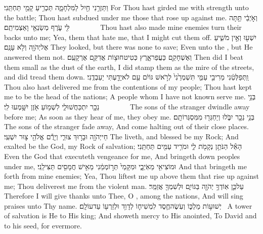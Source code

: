 {וַתַּזְרֵ֥נִי חַ֖יִל לַמִּלְחָמָ֑ה תַּכְרִ֥יעַ קָמַ֖י תַּחְתֵּֽנִי׃}
{For Thou hast girded me with strength unto the battle; Thou hast subdued under me those that rose up against me.}
{וְאֹ֣יְבַ֔י תַּ֥תָּה לִּ֖י עֹ֑רֶף מְשַׂנְאַ֖י וָאַצְמִיתֵֽם׃        }
{Thou hast also made mine enemies turn their backs unto me; Yea, them that hate me, that I might cut them off.}
{יִשְׁע֖וּ וְאֵ֣ין מֹשִׁ֑יעַ אֶל\maqqaf יְהֹוָ֖ה וְלֹ֥א עָנָֽם׃}
{They looked, but there was none to save; Even unto the \lord, but He answered them not.}
{וְאֶשְׁחָקֵ֖ם כַּעֲפַר\maqqaf אָ֑רֶץ כְּטִיט\maqqaf חוּצ֥וֹת אֲדִקֵּ֖ם אֶרְקָעֵֽם׃}
{Then did I beat them small as the dust of the earth, I did stamp them as the mire of the streets, and did tread them down.}
{וַֽתְּפַלְּטֵ֔נִי מֵרִיבֵ֖י עַמִּ֑י תִּשְׁמְרֵ֙נִי֙ לְרֹ֣אשׁ גּוֹיִ֔ם עַ֥ם לֹא\maqqaf יָדַ֖עְתִּי יַעַבְדֻֽנִי׃}
{Thou also hast delivered me from the contentions of my people; Thou hast kept me to be the head of the nations; A people whom I have not known serve me.}
{בְּנֵ֥י נֵכָ֖ר יִתְכַּחֲשׁוּ\maqqaf לִ֑י לִשְׁמ֥וֹעַ אֹ֖זֶן יִשָּׁ֥מְעוּ לִֽי׃        }
{The sons of the stranger dwindle away before me; As soon as they hear of me, they obey me.}
{בְּנֵ֥י נֵכָ֖ר יִבֹּ֑לוּ וְיַחְגְּר֖וּ מִמִּסְגְּרוֹתָֽם׃}
{The sons of the stranger fade away, And come halting out of their close places.}
{חַי\maqqaf יְהֹוָ֖ה וּבָר֣וּךְ צוּרִ֑י וְיָרֻ֕ם אֱלֹהֵ֖י צ֥וּר יִשְׁעִֽי׃}
{The \lord\space liveth, and blessed be my Rock; And exalted be the God, my Rock of salvation;}
{הָאֵ֕ל הַנֹּתֵ֥ן נְקָמֹ֖ת לִ֑י וּמֹרִ֥יד עַמִּ֖ים תַּחְתֵּֽנִי׃}
{Even the God that executeth vengeance for me, And bringeth down peoples under me,}
{וּמוֹצִיאִ֖י מֵאֹֽיְבָ֑י וּמִקָּמַי֙ תְּר֣וֹמְמֵ֔נִי מֵאִ֥ישׁ חֲמָסִ֖ים תַּצִּילֵֽנִי׃}
{And that bringeth me forth from mine enemies; Yea, Thou liftest me up above them that rise up against me; Thou deliverest me from the violent man.}
{עַל\maqqaf כֵּ֛ן אֽוֹדְךָ֥ יְהֹוָ֖ה בַּגּוֹיִ֑ם וּלְשִׁמְךָ֖ אֲזַמֵּֽר׃}
{Therefore I will give thanks unto Thee, O \lord, among the nations, And will sing praises unto Thy name.}
{ יְשׁוּע֣וֹת מַלְכּ֑וֹ וְעֹֽשֶׂה\maqqaf חֶ֧סֶד לִמְשִׁיח֛וֹ לְדָוִ֥ד וּלְזַרְע֖וֹ עַד\maqqaf עוֹלָֽם׃ \petucha }
{A tower of salvation is He to His king; And showeth mercy to His anointed, To David and to his seed, for evermore.}
